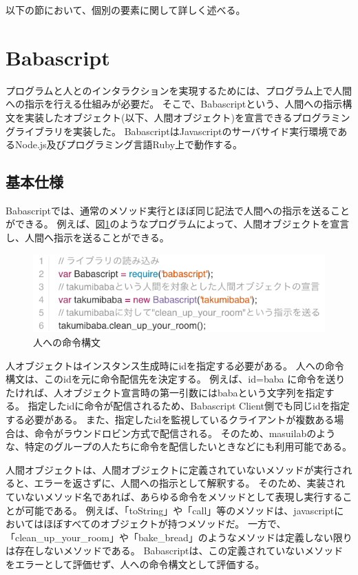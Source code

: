 以下の節において、個別の要素に関して詳しく述べる。

\section{Babascript}\label{babascript}

プログラムと人とのインタラクションを実現するためには、プログラム上で人間への指示を行える仕組みが必要だ。
そこで、Babascriptという、人間への指示構文を実装したオブジェクト(以下、人間オブジェクト)を宣言できるプログラミングライブラリを実装した。
BabascriptはJavascriptのサーバサイド実行環境であるNode.js及びプログラミング言語Ruby上で動作する。

\subsection{基本仕様}\label{ux57faux672cux4ed5ux69d8}

Babascriptでは、通常のメソッド実行とほぼ同じ記法で人間への指示を送ることができる。
例えば、図\ref{fig:babascript_sample}のようなプログラムによって、人間オブジェクトを宣言し、人間へ指示を送ることができる。

\begin{figure}[htbp]
  \begin{center}
  \includegraphics[width=.8\linewidth,bb=0 0 563 151]{images/babascript_sample.js.png}
  \end{center}
  \caption{人への命令構文}
  \label{fig:babascript_sample}
\end{figure}

人オブジェクトはインスタンス生成時にidを指定する必要がある。
人への命令構文は、このidを元に命令配信先を決定する。 例えば、id=baba
に命令を送りたければ、人オブジェクト宣言時の第一引数にはbabaという文字列を指定する。
指定したidに命令が配信されるため、Babascript
Client側でも同じidを指定する必要がある。
また、指定したidを監視しているクライアントが複数ある場合は、命令がラウンドロビン方式で配信される。
そのため、masuilabのような、特定のグループの人たちに命令を配信したいときなどにも利用可能である。

人間オブジェクトは、人間オブジェクトに定義されていないメソッドが実行されると、エラーを返さずに、人間への指示として解釈する。
そのため、実装されていないメソッド名であれば、あらゆる命令をメソッドとして表現し実行することが可能である。
例えば、「toString」や「call」等のメソッドは、javascriptにおいてはほぼすべてのオブジェクトが持つメソッドだ。
一方で、「clean\_up\_your\_room」や「bake\_bread」のようなメソッドは定義しない限りは存在しないメソッドである。
Babascriptは、この定義されていないメソッドをエラーとして評価せず、人への命令構文として評価する。

